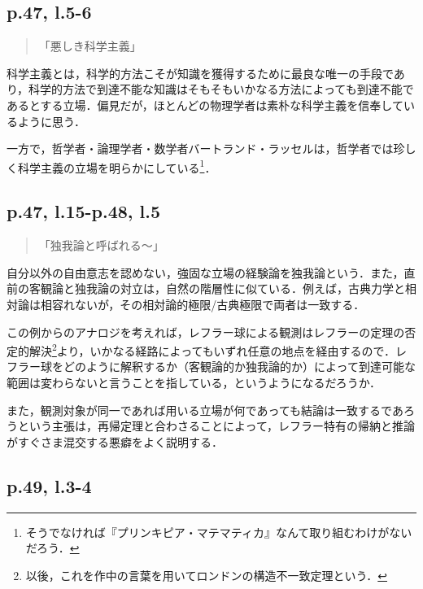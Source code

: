 \documentclass[10pt, a5paper, twoside]{jsarticle}
\theoremstyle{definition}
\begin{document}
            \subsection{p.47, l.5-6}

                \begin{quote}

                    「悪しき科学主義」

                \end{quote}

                科学主義とは，科学的方法こそが知識を獲得するために最良な唯一の手段であり，科学的方法で到達不能な知識はそもそもいかなる方法によっても到達不能であるとする立場．偏見だが，ほとんどの物理学者は素朴な科学主義を信奉しているように思う．

                一方で，哲学者・論理学者・数学者バートランド・ラッセルは，哲学者では珍しく科学主義の立場を明らかにしている\footnote{そうでなければ『プリンキピア・マテマティカ』なんて取り組むわけがないだろう．}．

            \subsection{p.47, l.15-p.48, l.5}

                \begin{quote}

                    「独我論と呼ばれる〜」

                \end{quote}

                自分以外の自由意志を認めない，強固な立場の経験論を独我論という．また，直前の客観論と独我論の対立は，自然の階層性に似ている．例えば，古典力学と相対論は相容れないが，その相対論的極限/古典極限で両者は一致する．

                この例からのアナロジを考えれば，レフラー球による観測はレフラーの定理の否定的解決\footnote{以後，これを作中の言葉を用いてロンドンの構造不一致定理という．}より，いかなる経路によってもいずれ任意の地点を経由するので．レフラー球をどのように解釈するか（客観論的か独我論的か）によって到達可能な範囲は変わらないと言うことを指している，というようになるだろうか．

                また，観測対象が同一であれば用いる立場が何であっても結論は一致するであろうという主張は，再帰定理と合わさることによって，レフラー特有の帰納と推論がすぐさま混交する悪癖をよく説明する．

            \subsection{p.49, l.3-4}
\end{document}
